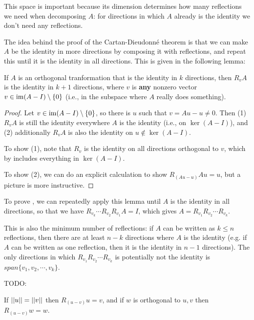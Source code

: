 This space is important because its dimension determines how many reflections we need when decomposing $A$: for directions in which $A$ already is the identity we don't need any reflections.

The idea behind the proof of the Cartan-Dieudonné theorem is that we can make $A$ be the identity in more directions by composing it with reflections, and repeat this until it is the identity in all directions.
This is given in the following lemma:

\begin{lemma}
  If $A$ is an orthogonal tranformation that is the identity in $k$ directions, then $R_v A$ is the identity in $k+1$ directions, where $v$ is \textbf{any} nonzero vector $v \in \operatorname{im}(A - I) \setminus \{ 0 \}$ (i.e., in the subspace where $A$ really does something).
\end{lemma}
\begin{proof}
  Let $v \in \operatorname{im}(A-I) \setminus \{ 0 \}$, so there is $u$ such that $v = Au - u \neq 0$.
  Then (1) $R_v A$ is still the identity everywhere $A$ is the identity (i.e., on $\ker(A - I)$), and (2) additionally $R_v A$ is also the identity on $u \notin \ker(A - I)$.

  To show (1), note that $R_v$ is the identity on all directions orthogonal to $v$, which by  includes everything in $\ker(A - I)$.

  To show (2), we can do an explicit calculation to show $R_{(Au - u)}Au = u$, but a picture is more instructive.
\end{proof}

To prove , we can repeatedly apply this lemma until $A$ is the identity in all directions, so that we have $R_{v_k} \cdots R_{v_2} R_{v_1} A = I$, which gives $A = R_{v_1} R_{v_2} \cdots R_{v_k}$.

This is also the minimum number of reflections: if $A$ can be written as $k \leq n$ reflections, then there are at least $n - k$ directions where $A$ is the identity (e.g. if $A$ can be written as one reflection, then it is the identity in $n - 1$ directions).
The only directions in which $R_{v_1} R_{v_2} \cdots R_{v_k}$ is potentially not the identity is $span \{v_1, v_2, \cdots, v_k\}$.

TODO:

\begin{lemma}
  If $||u|| = ||v||$ then $R_{(u - v)}u = v$, and if $w$ is orthogonal to $u,v$ then $R_{(u-v)}w = w$.
\end{lemma}


% 
% 



